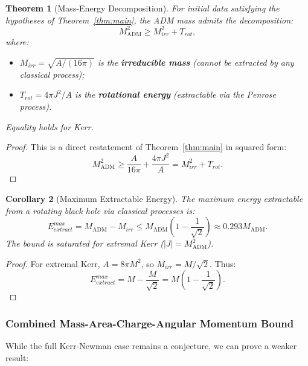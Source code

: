 \documentclass[12pt]{article}
\theoremstyle{plain}
\newtheorem{theorem}{Theorem}[section]
\newtheorem{corollary}[theorem]{Corollary}
\theoremstyle{definition}
\theoremstyle{remark}
\newcommand{\ADM}{\mathrm{ADM}}
\begin{document}
\begin{theorem}[Mass-Energy Decomposition]\label{thm:mass-decomposition}
For initial data satisfying the hypotheses of Theorem~\ref{thm:main}, the ADM mass admits the decomposition:
\begin{equation}
    M_{\ADM}^2 \geq M_{irr}^2 + T_{rot},
\end{equation}
where:
\begin{itemize}
    \item $M_{irr} = \sqrt{A/(16\pi)}$ is the \textbf{irreducible mass} (cannot be extracted by any classical process);
    \item $T_{rot} = 4\pi J^2/A$ is the \textbf{rotational energy} (extractable via the Penrose process).
\end{itemize}
Equality holds for Kerr.
\end{theorem}

\begin{proof}
This is a direct restatement of Theorem~\ref{thm:main} in squared form:
\[
M_{\ADM}^2 \geq \frac{A}{16\pi} + \frac{4\pi J^2}{A} = M_{irr}^2 + T_{rot}.
\]
\end{proof}

\begin{corollary}[Maximum Extractable Energy]
The maximum energy extractable from a rotating black hole via classical processes is:
\begin{equation}
    E_{extract}^{max} = M_{\ADM} - M_{irr} \leq M_{\ADM}\left(1 - \frac{1}{\sqrt{2}}\right) \approx 0.293 M_{\ADM}.
\end{equation}
The bound is saturated for extremal Kerr ($|J| = M_{\ADM}^2$).
\end{corollary}

\begin{proof}
For extremal Kerr, $A = 8\pi M^2$, so $M_{irr} = M/\sqrt{2}$. Thus:
\[
E_{extract}^{max} = M - \frac{M}{\sqrt{2}} = M\left(1 - \frac{1}{\sqrt{2}}\right).
\]
\end{proof}

\subsubsection{Combined Mass-Area-Charge-Angular Momentum Bound}

While the full Kerr-Newman case remains a conjecture, we can prove a weaker result:
\end{document}
